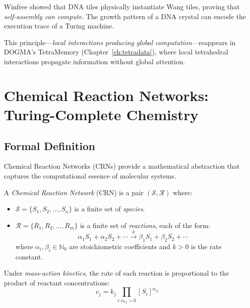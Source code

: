 Winfree showed that DNA tiles physically instantiate Wang tiles, proving that \emph{self-assembly can compute}. The growth pattern of a DNA crystal can encode the execution trace of a Turing machine.

This principle---\emph{local interactions producing global computation}---reappears in DOGMA's TetraMemory (Chapter~\ref{ch:tetradata}), where local tetrahedral interactions propagate information without global attention.

\section{Chemical Reaction Networks: Turing-Complete Chemistry}
\label{sec:crn}

\subsection{Formal Definition}

Chemical Reaction Networks (CRNs) provide a mathematical abstraction that captures the computational essence of molecular systems.

\begin{definition}
\label{def:crn-ch2}
A \emph{Chemical Reaction Network} (CRN) is a pair $(\mathcal{S}, \mathcal{R})$ where:
\begin{itemize}[leftmargin=1.5em]
  \item $\mathcal{S} = \{S_1, S_2, \ldots, S_n\}$ is a finite set of \emph{species}.
  \item $\mathcal{R} = \{R_1, R_2, \ldots, R_m\}$ is a finite set of \emph{reactions}, each of the form:
  \begin{equation}
  \alpha_1 S_1 + \alpha_2 S_2 + \cdots \xrightarrow{k} \beta_1 S_1 + \beta_2 S_2 + \cdots
  \end{equation}
  where $\alpha_i, \beta_i \in \mathbb{N}_0$ are stoichiometric coefficients and $k > 0$ is the rate constant.
\end{itemize}
\end{definition}

Under \emph{mass-action kinetics}, the rate of each reaction is proportional to the product of reactant concentrations:
\begin{equation}
\label{eq:mass-action-ch2}
v_j = k_j \prod_{i : \alpha_{ij} > 0} [S_i]^{\alpha_{ij}}
\end{equation}

